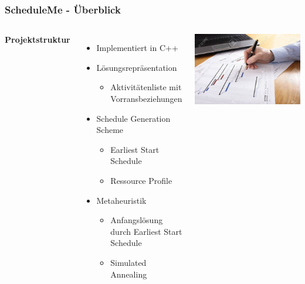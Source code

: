 \documentclass[aspectratio=169]{beamer}
\begin{document}
\begin{frame}
	\frametitle{ScheduleMe - Überblick}
	\begin{columns}[c] %
		
		\textbf{Projektstruktur}
		\begin{itemize}
			\item Implementiert in C++
			\item Lösungsrepräsentation
			\begin{itemize}
				\item Aktivitätenliste mit Vorransbeziehungen
			\end{itemize} 
			\item Schedule Generation Scheme
			\begin{itemize}
				\item Earliest Start Schedule
				\item Ressource Profile
			\end{itemize}
			\item Metaheuristik
			\begin{itemize}
				\item Anfangslösung durch Earliest Start Schedule
				\item Simulated Annealing
			\end{itemize}
		\end{itemize}
		\includegraphics[scale=.5]{../images/stock.jpg}
	\end{columns}
\end{frame} 
  
\end{document}
